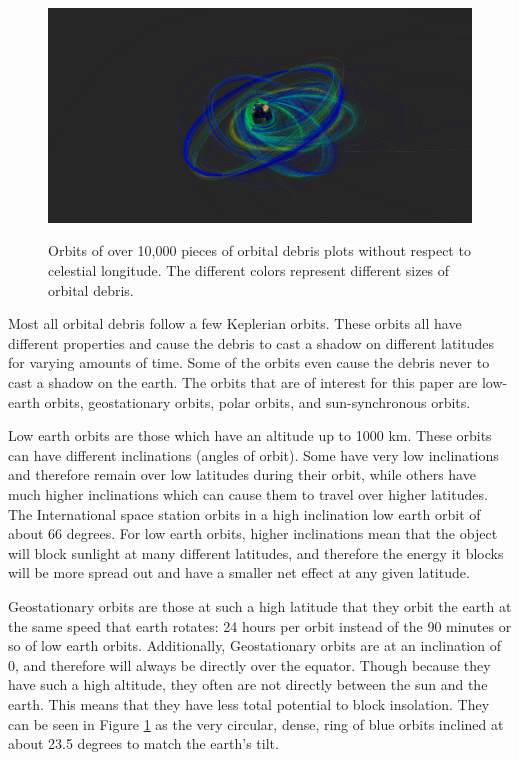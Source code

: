 \documentclass[11pt]{article}
\begin{document}
\begin{multicols*}{2}
\begin{figure}[!tbp]
\caption{Orbits of over 10,000 pieces of orbital debris plots without respect to celestial longitude. The different colors represent different sizes of orbital debris.}
\centering
\includegraphics[width=1\textwidth]{orbits2.png}
\label{fig:orbits}
\end{figure}

Most all orbital debris follow a few Keplerian orbits. These orbits all have different properties and cause the debris to cast a shadow on different latitudes for varying amounts of time. Some of the orbits even cause the debris never to cast a shadow on the earth. The orbits that are of interest for this paper are low-earth orbits, geostationary orbits, polar orbits, and sun-synchronous orbits.

Low earth orbits are those which have an altitude up to 1000 km.\cite{esa} These orbits can have different inclinations (angles of orbit). Some have very low inclinations and therefore remain over low latitudes during their orbit, while others have much higher inclinations which can cause them to travel over higher latitudes. The International space station orbits in a high inclination low earth orbit of about 66 degrees. For low earth orbits, higher inclinations mean that the object will block sunlight at many different latitudes, and therefore the energy it blocks will be more spread out and have a smaller net effect at any given latitude. 

Geostationary orbits are those at such a high latitude that they orbit the earth at the same speed that earth rotates: 24 hours per orbit instead of the 90 minutes or so of low earth orbits. Additionally, Geostationary orbits are at an inclination of 0, and therefore will always be directly over the equator. Though because they have such a high altitude, they often are not directly between the sun and the earth. This means that they have less total potential to block insolation. They can be seen in Figure \ref{fig:orbits} as the very circular, dense, ring of blue orbits inclined at about 23.5 degrees to match the earth's tilt.


\end{multicols*}
\end{document}
